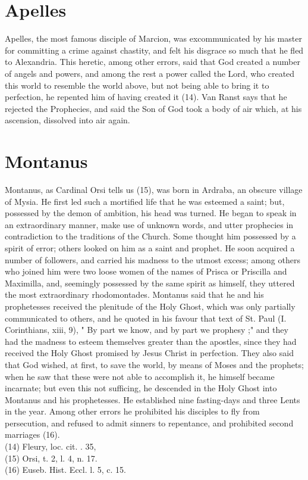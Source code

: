 \documentclass[12pt]{book}
\begin{document}
\section{Apelles}
Apelles, the most famous disciple of Marcion, was excommunicated by his master for committing a
crime against chastity, and felt his disgrace so much that he fled to Alexandria. This heretic, among other
errors, said that God created a number of angels and powers, and among the rest a power called the
Lord, who created this world to resemble the world above, but not being able to bring it to perfection, he
repented him of having created it (14). Van Ranst says that he rejected the Prophecies, and said the Son of
God took a body of air which, at his ascension, dissolved into air again.
\section{Montanus}
Montanus, as Cardinal Orsi tells us (15), was born in Ardraba, an obscure village of Mysia. He first led
such a mortified life that he was esteemed a saint; but, possessed by the demon of ambition, his head was
turned. He began to speak in an extraordinary manner, make use of unknown words, and utter
prophecies in contradiction to the traditions of the Church. Some thought him possessed by a spirit of
error; others looked on him as a saint and prophet. He soon acquired a number of followers, and carried
his madness to the utmost excess; among others who joined him were two loose women of the names of
Prisca or Priscilla and Maximilla, and, seemingly possessed by the same spirit as himself, they uttered the
most extraordinary rhodomontades. Montanus said that he and his prophetesses received the plenitude
of the Holy Ghost, which was only partially communicated to others, and he quoted in his favour that
text of St. Paul (I. Corinthians, xiii, 9), " By part we know, and by part we prophesy ;" and they had the
madness to esteem themselves greater than the apostles, since they had received the Holy Ghost
promised by Jesus Christ in perfection. They also said that God wished, at first, to save the world, by
means of Moses and the prophets; when he saw that these were not able to accomplish it, he himself
became incarnate; but even this not sufficing, he descended in the Holy Ghost into Montanus and his
prophetesses. He established nine fasting-days and three Lents in the year. Among other errors he
prohibited his disciples to fly from persecution, and refused to admit sinners to repentance, and
prohibited second marriages (16).\\
(14) Fleury, loc. cit. . 35, \\
(15) Orsi, t. 2, l. 4, n. 17. \\
(16) Euseb. Hist. Eccl. l. 5, c. 15.\\
\end{document}
